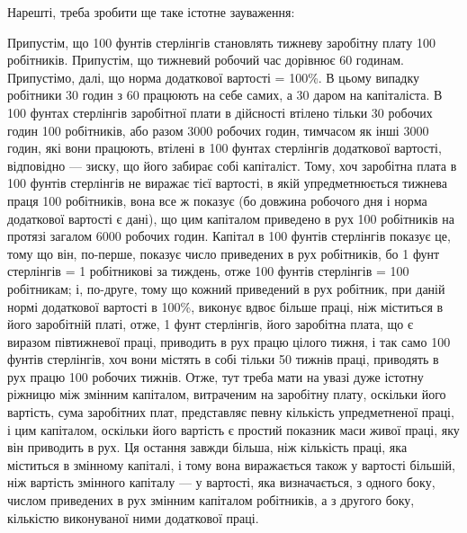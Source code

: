 Нарешті, треба зробити ще таке істотне зауваження:

Припустім, що 100 фунтів стерлінгів становлять тижневу
заробітну плату 100 робітників. Припустім, що тижневий робочий час дорівнює 60 годинам. Припустімо,
далі, що норма
додаткової вартості = 100\%. В цьому випадку робітники 30 годин з 60 працюють на себе самих, а 30
даром на капіталіста.
В 100 фунтах стерлінгів заробітної плати в дійсності втілено
тільки 30 робочих годин 100 робітників, або разом 3000 робочих годин, тимчасом як інші 3000 годин,
які вони працюють,
втілені в 100 фунтах стерлінгів додаткової вартості, відповідно — зиску, що його забирає собі
капіталіст. Тому, хоч заробітна плата в 100 фунтів стерлінгів не виражає тієї вартості,
в якій упредметнюється тижнева праця 100 робітників, вона
все ж показує (бо довжина робочого дня і норма додаткової
вартості є дані), що цим капіталом приведено в рух 100 робітників на протязі загалом 6000 робочих
годин. Капітал в 100 фунтів стерлінгів показує це, тому що він, по-перше, показує
число приведених в рух робітників, бо 1 фунт стерлінгів = 1 робітникові за тиждень, отже 100 фунтів
стерлінгів = 100 робітникам; і, по-друге, тому що кожний приведений
в рух робітник, при даній нормі додаткової вартості в 100\%,
виконує вдвоє більше праці, ніж міститься в його заробітній
платі, отже, 1 фунт стерлінгів, його заробітна плата, що є виразом півтижневої праці, приводить в
рух працю цілого тижня,
і так само 100 фунтів стерлінгів, хоч вони містять в собі тільки 50
тижнів праці, приводять в рух працю 100 робочих тижнів. Отже,
тут треба мати на увазі дуже істотну ріжницю між змінним капіталом, витраченим на заробітну плату,
оскільки його вартість,
сума заробітних плат, представляє певну кількість упредметненої праці, і цим капіталом, оскільки
його вартість є простий показник маси живої праці, яку він приводить в рух. Ця
остання завжди більша, ніж кількість праці, яка міститься
в змінному капіталі, і тому вона виражається також у вартості
більшій, ніж вартість змінного капіталу — у вартості, яка визначається, з одного боку, числом
приведених в рух змінним капіталом робітників, а з другого боку, кількістю виконуваної ними
додаткової праці.
